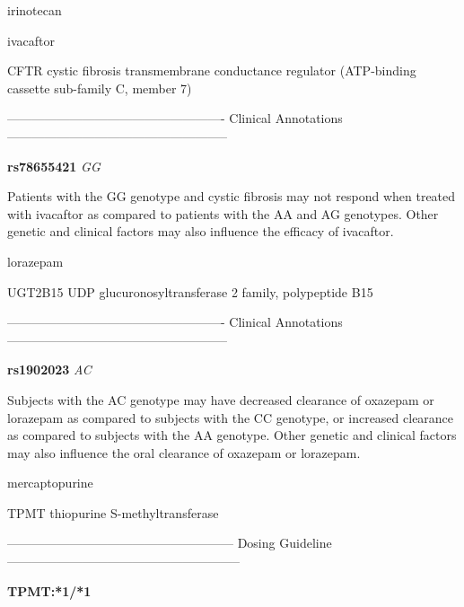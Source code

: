 \documentclass{resume} %
\begin{document}
\begin{rSection}{ irinotecan }
\end{rSection}\begin{rSection}{ ivacaftor }
\item[]

\begin{rSubsection}{ CFTR }{ cystic fibrosis transmembrane conductance regulator (ATP-binding cassette sub-family C, member 7) }{}{}
\item[]

\item[] ---------------------------------------------------- Clinical Annotations -----------------------------------------------------\newline
\item \textbf{ rs78655421 } \textit{ GG }
\item[] Patients with the GG genotype and cystic fibrosis may not respond when treated with ivacaftor as compared to patients with the AA and AG genotypes. Other genetic and clinical factors may also influence the efficacy of ivacaftor.
\end{rSubsection}

\end{rSection}\begin{rSection}{ lorazepam }
\item[]

\begin{rSubsection}{ UGT2B15 }{ UDP glucuronosyltransferase 2 family, polypeptide B15 }{}{}
\item[]

\item[] ---------------------------------------------------- Clinical Annotations -----------------------------------------------------\newline
\item \textbf{ rs1902023 } \textit{ AC }
\item[] Subjects with the AC genotype may have decreased clearance of oxazepam or lorazepam as compared to subjects with the CC genotype, or increased clearance as compared to subjects with the AA genotype. Other genetic and clinical factors may also influence the oral clearance of oxazepam or lorazepam.
\end{rSubsection}

\end{rSection}\begin{rSection}{ mercaptopurine }
\item[]

\begin{rSubsection}{ TPMT }{ thiopurine S-methyltransferase }{}{}
\item[]
\item[] ------------------------------------------------------ Dosing Guideline --------------------------------------------------------\newline
\item[] \textbf{ TPMT:*1/*1 }


\end{rSubsection}
\end{rSection}
\end{document}
